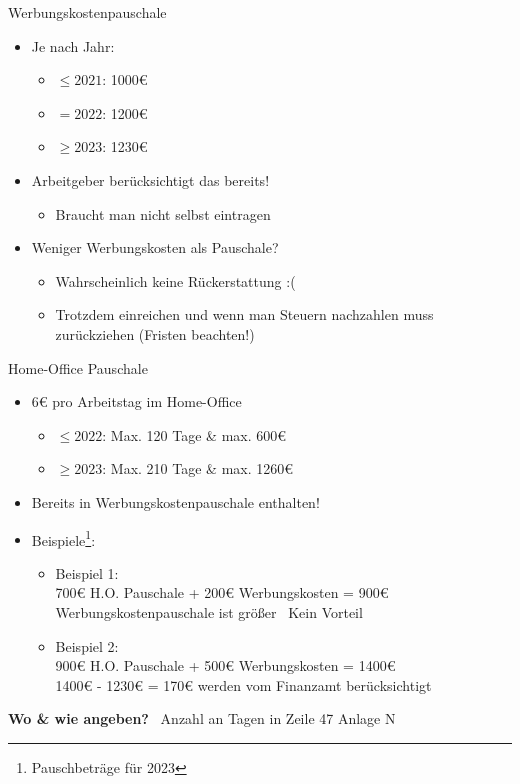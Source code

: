 \documentclass{beamer}
\begin{document}
			\begin{frame}{Werbungskostenpauschale}
				\begin{itemize}
					\item Je nach Jahr:
					\begin{itemize}
						\item $\leq2021$: 1000€
						\item $=2022$: 1200€
						\item $\geq2023$: 1230€
					\end{itemize}
					\item Arbeitgeber berücksichtigt das bereits!
					\begin{itemize}
						\item Braucht man nicht selbst eintragen
					\end{itemize}
					\item Weniger Werbungskosten als Pauschale?
					\begin{itemize}
						\item Wahrscheinlich keine Rückerstattung :(
						\item Trotzdem einreichen und wenn man Steuern nachzahlen muss zurückziehen (Fristen beachten!)
					\end{itemize}
				\end{itemize}
			\end{frame}
		
			\begin{frame}{Home-Office Pauschale}
				\begin{itemize}
					\item 6€ pro Arbeitstag im Home-Office
					\begin{itemize}
						\item $\leq2022$: Max. 120 Tage \& max. 600€
						\item $\geq2023$: Max. 210 Tage \& max. 1260€
					\end{itemize}
					\item Bereits in Werbungskostenpauschale enthalten!\pause
					\item Beispiele\footnote{Pauschbeträge für 2023}:
					\begin{itemize}
						\item Beispiel 1:\\
						700€ H.O. Pauschale + 200€ Werbungskosten = 900€\\
						Werbungskostenpauschale ist größer \textrightarrow\ Kein Vorteil\pause
						\item Beispiel 2:\\
						900€ H.O. Pauschale + 500€ Werbungskosten = 1400€\\
						1400€ - 1230€ = 170€ werden vom Finanzamt berücksichtigt
					\end{itemize}
				\end{itemize}
				\textbf{Wo \& wie angeben?} \textrightarrow\ Anzahl an Tagen in Zeile 47 Anlage N
			\end{frame}
		
\end{document}
